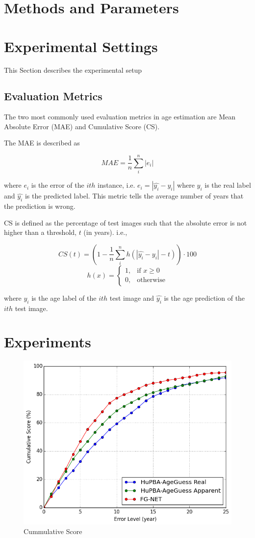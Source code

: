 \section{Methods and Parameters}

\section{Experimental Settings}
This Section describes the experimental setup 
\subsection{Evaluation Metrics} 

The two most commonly used evaluation metrics in age estimation are Mean Absolute Error (MAE) and Cumulative Score (CS).

The MAE is described as

\begin{equation}
MAE = \frac{1}{n}\sum_i^{n} |e_i|
\end{equation}

where $e_i$ is the error of the $ith$ instance, i.e. $e_i = |\hat{y_i} - y_i|$ where $y_i $ is the real label and $\hat{y_i}$ is the predicted label. This metric tells the average number of years that the prediction is wrong.

CS is defined as the percentage of test images such that the absolute error is not higher than a threshold, $t$ (in years). i.e.,

\begin{equation}
CS(t) = (1 - \frac{1}{n}\sum_i^n h(|\hat{y_i} - y_i| - t))\cdot 100
\end{equation}
\begin{equation}
h(x) = 
\begin{cases}
1,				& \text{if } x \geq 0\\
0,              & \text{otherwise}
\end{cases}
\end{equation}

where $y_i$ is the age label of the $ith$ test image and $\hat{y_i}$ is the age prediction of the $ith$ test image.

\section{Experiments}

\begin{figure}[!h]
	\centering
	\includegraphics[width=\textwidth]{figures/cum_score}
	\caption{Cummulative Score }
	\label{fig:cumS}
\end{figure}
